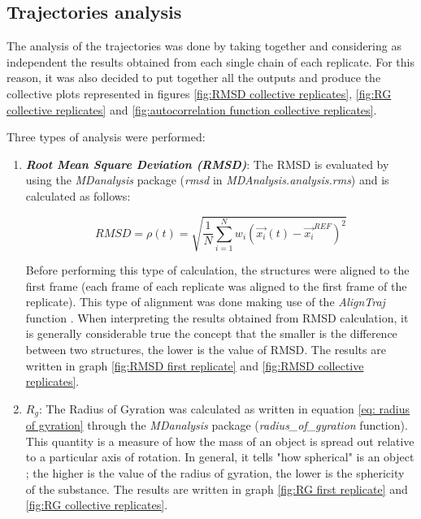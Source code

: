 \subsection{Trajectories analysis} \label{chap: trajectory analysis}

The analysis of the trajectories was done by taking together and considering as independent the results obtained from each single chain of each replicate. For this reason, it was also decided to put together all the outputs and produce the collective plots represented in figures \ref{fig:RMSD collective replicates}, \ref{fig:RG collective replicates} and \ref{fig:autocorrelation function collective replicates}.

Three types of analysis were performed: 

\begin{enumerate}
    \item \textbf{\textit{Root Mean Square Deviation (RMSD)}}: The RMSD is evaluated by using the \textit{MDanalysis} package
    \cite{gowersMDAnalysisPythonPackage2016} (\textit{rmsd} in \textit{MDAnalysis.analysis.rms})
    and is calculated as follows:

    \begin{equation} \label{eq: RMSD}
        RMSD = \rho(t) = \sqrt{\frac{1}{N} \sum_{i=1}^N{w_i \left(\vec{x_i}(t) - \vec{x_i}^{REF}\right)^2}}
    \end{equation}

    Before performing this type of calculation, the structures were aligned to the first frame (each frame of each replicate was aligned to the first frame of the replicate). This type of alignment was done making use of the \textit{AlignTraj} function
    \cite{gowersMDAnalysisPythonPackage2016}
    . When interpreting the results obtained from RMSD calculation, it is generally considerable true the concept that the smaller is the difference between two structures, the lower is the value of RMSD. The results are written in graph \ref{fig:RMSD first replicate} and \ref{fig:RMSD collective replicates}.
    


    \item \textbf{$R_g$}: The Radius of Gyration was calculated as written in equation \ref{eq: radius of gyration} through the \textit{MDanalysis} package (\textit{radius\_of\_gyration} function). This quantity is a measure of how the mass of an object is spread out relative to a particular axis of rotation. In general, it tells "how spherical" is an object
    \cite{gowersMDAnalysisPythonPackage2016,tuckermanStatisticalMechanicsTheory2015}
    ; the higher is the value of the radius of gyration, the lower is the sphericity of the substance. The results are written in graph \ref{fig:RG first replicate} and \ref{fig:RG collective replicates}.
    


\end{enumerate}
